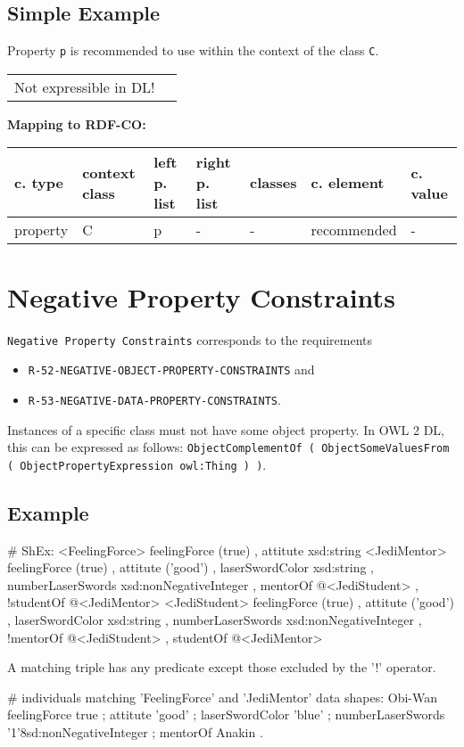 \documentclass{llncs}
\newcommand{\ms}[1]{\texttt{#1}}
\newenvironment{gcotable}{
  \scriptsize
  \sffamily
  \vspace{0cm}
	\begin{center}
	\textbf{\vspace{0.4cm}Mapping to RDF-CO:} \\
  \begin{tabular}{l|l|l|l|l|l|l}
	\hline
  \textbf{c. type} & \textbf{context class} & \textbf{left p. list} & \textbf{right p. list} & \textbf{classes} & \textbf{c. element} & \textbf{c. value} \\
  \hline

}{
  \hline
  \end{tabular}
	\end{center}
}
\newenvironment{DL}{
  \vspace{0cm}
	\begin{center}
  \begin{tabular}{r l}

}{
  \end{tabular}
	\end{center}
}
\begin{document}
\subsection{Simple Example}

Property \ms{p} is recommended to use within the context of the class \ms{C}.

\begin{DL}
Not expressible in DL!
\end{DL}

\begin{gcotable}
property & C & p & - & - & recommended & - \\
\end{gcotable}

\section{Negative Property Constraints}

\ms{Negative Property Constraints} corresponds to the requirements
\begin{itemize}
	\item \ms{R-52-NEGATIVE-OBJECT-PROPERTY-CONSTRAINTS} and
	\item \ms{R-53-NEGATIVE-DATA-PROPERTY-CONSTRAINTS}.
\end{itemize}
Instances of a specific class must not have some object property.
In OWL 2 DL, this can be expressed as follows: \ms{ObjectComplementOf ( ObjectSomeValuesFrom ( ObjectPropertyExpression owl:Thing ) )}.

\subsection{Example}

\begin{ex}
# ShEx:
<FeelingForce> {
    feelingForce (true) ,
    attitute xsd:string }
<JediMentor> {
    feelingForce (true) ,
    attitute ('good') ,
    laserSwordColor xsd:string ,
    numberLaserSwords xsd:nonNegativeInteger ,
    mentorOf @<JediStudent> ,
   !studentOf @<JediMentor> }
<JediStudent> {
    feelingForce (true) ,
    attitute ('good') ,
    laserSwordColor xsd:string ,
    numberLaserSwords xsd:nonNegativeInteger ,
   !mentorOf @<JediStudent> ,
    studentOf @<JediMentor> }
\end{ex}

A matching triple has any predicate except those excluded by the '!' operator.

\begin{ex}
# individuals matching 'FeelingForce' and 'JediMentor' data shapes:
Obi-Wan 
    feelingForce true ;
    attitute 'good' ;
    laserSwordColor 'blue' ;
    numberLaserSwords '1'^^xsd:nonNegativeInteger ;
    mentorOf Anakin .
\end{ex}
\end{document}
